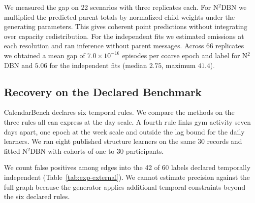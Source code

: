 \documentclass[sigconf]{acmart}
\begin{document}
We measured the gap on 22 scenarios with three replicates each. For N$^2$DBN we multiplied the predicted parent totals by normalized child weights under the generating parameters. This gives coherent point predictions without integrating over capacity redistribution. For the independent fits we estimated emissions at each resolution and ran inference without parent messages. Across 66 replicates we obtained a mean gap of \(7.0\times10^{-16}\) episodes per coarse epoch and label for N$^2$DBN and \(5.06\) for the independent fits (median \(2.75\), maximum \(41.4\)).

\subsection{Recovery on the Declared Benchmark}
\label{sec:exp:external}

CalendarBench declares six temporal rules. We compare the methods on the three rules all can express at the day scale. A fourth rule links gym activity seven days apart, one epoch at the week scale and outside the lag bound for the daily learners. We ran eight published structure learners on the same 30 records and fitted N$^2$DBN with cohorts of one to 30 participants.

We count false positives among edges into the 42 of 60 labels declared temporally independent (Table~\ref{tab:exp-external}). We cannot estimate precision against the full graph because the generator applies additional temporal constraints beyond the six declared rules.
\end{document}
